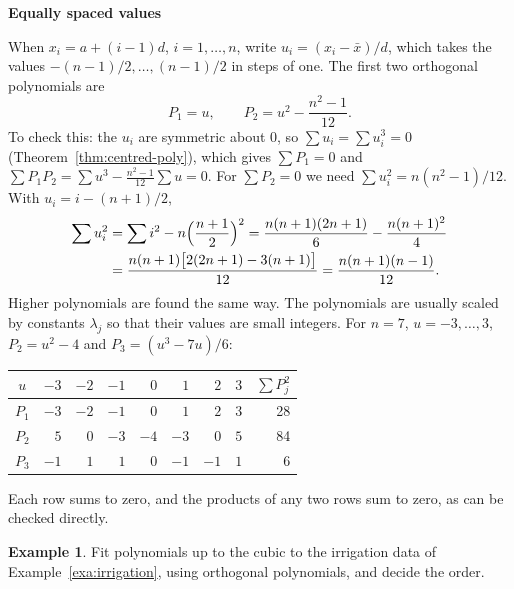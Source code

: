 \documentclass[11pt,a4paper]{article}
\numberwithin{equation}{section}
\theoremstyle{definition}
\newtheorem{exa}[thm]{Example}
\newcommand{\subhead}[1]{%
  \par\medskip\noindent\textbf{#1}\par\nobreak\smallskip}
\begin{document}
\subhead{Equally spaced values}
When $x_i = a + (i - 1)d$, $i = 1, \dots, n$, write $u_i = (x_i - \bar x)/d$, which takes the values $-(n - 1)/2, \dots, (n - 1)/2$ in steps of
one. The first two orthogonal polynomials are
\[
P_1 = u , \qquad P_2 = u^2 - \frac{n^2 - 1}{12} .
\]
To check this: the $u_i$ are symmetric about $0$, so $\sum u_i = \sum u_i^3 = 0$ (Theorem~\ref{thm:centred-poly}), which gives
$\sum P_1 = 0$ and $\sum P_1P_2 = \sum u^3 - \frac{n^2 - 1}{12}\sum u = 0$. For $\sum P_2 = 0$ we need
$\sum u_i^2 = n(n^2 - 1)/12$. With $u_i = i - (n + 1)/2$,
\begin{align*}
\sum u_i^2 &= \sum i^2 - n\Bigl(\frac{n + 1}{2}\Bigr)^2 = \frac{n(n + 1)(2n + 1)}{6} - \frac{n(n + 1)^2}{4} \\
&= \frac{n(n + 1)\bigl[2(2n + 1) - 3(n + 1)\bigr]}{12} = \frac{n(n + 1)(n - 1)}{12} .
\end{align*}
Higher polynomials are found the same way. The polynomials are usually scaled by constants $\lambda_j$ so
that their values are small integers. For $n = 7$, $u = -3, \dots, 3$, $P_2 = u^2 - 4$ and $P_3 = (u^3 - 7u)/6$:
\begin{center}
\begin{tabular}{c|rrrrrrr|r}
$u$ & $-3$ & $-2$ & $-1$ & $0$ & $1$ & $2$ & $3$ & $\sum P_j^2$ \\
\hline
$P_1$ & $-3$ & $-2$ & $-1$ & $0$ & $1$ & $2$ & $3$ & 28 \\
$P_2$ & $5$ & $0$ & $-3$ & $-4$ & $-3$ & $0$ & $5$ & 84 \\
$P_3$ & $-1$ & $1$ & $1$ & $0$ & $-1$ & $-1$ & $1$ & 6 \\
\end{tabular}
\end{center}
Each row sums to zero, and the products of any two rows sum to zero, as can be checked directly.

\begin{exa}\label{exa:irrigation-orth}
Fit polynomials up to the cubic to the irrigation data of Example~\ref{exa:irrigation}, using orthogonal polynomials,
and decide the order.
\end{exa}
\end{document}
